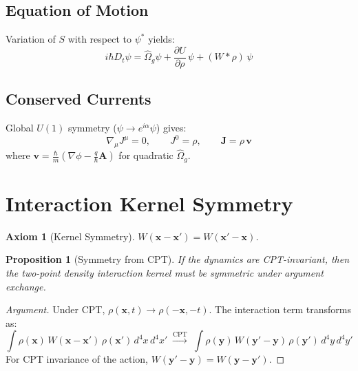 \documentclass[11pt, a4paper]{article}
\newtheorem{axiom}{Axiom}[section]
\newtheorem{proposition}{Proposition}[section]
\begin{document}
\subsection{Equation of Motion}

Variation of $S$ with respect to $\psi^*$ yields:
\begin{equation}
  \boxed{
  i\hbar D_t \psi = \hat{\Omega}_g \psi
    + \frac{\partial U}{\partial \rho}\,\psi
    + (W * \rho)\,\psi
  }
  \label{eq:eom}
\end{equation}

\subsection{Conserved Currents}

Global $U(1)$ symmetry ($\psi \to e^{i\alpha}\psi$) gives:
\begin{equation}
  \nabla_\mu J^\mu = 0, \qquad
  J^0 = \rho, \qquad
  \mathbf{J} = \rho\, \mathbf{v}
  \label{eq:current}
\end{equation}
where $\mathbf{v} = \frac{\hbar}{m}\!\left(\nabla\phi
- \frac{q}{\hbar}\mathbf{A}\right)$ for quadratic $\hat{\Omega}_g$.

\section{Interaction Kernel Symmetry}

\begin{axiom}[Kernel Symmetry]
$W(\mathbf{x}-\mathbf{x}') = W(\mathbf{x}'-\mathbf{x})$.
\end{axiom}

\begin{proposition}[Symmetry from CPT]
If the dynamics are CPT-invariant, then the two-point density
interaction kernel must be symmetric under argument exchange.
\end{proposition}

\begin{proof}[Argument]
Under CPT, $\rho(\mathbf{x},t) \to \rho(-\mathbf{x},-t)$. The
interaction term transforms as:
\[
  \int \rho(\mathbf{x})\, W(\mathbf{x}-\mathbf{x}')\,
  \rho(\mathbf{x}')\, d^4x\, d^4x'
  \;\xrightarrow{\text{CPT}}\;
  \int \rho(\mathbf{y})\, W(\mathbf{y}'-\mathbf{y})\,
  \rho(\mathbf{y}')\, d^4y\, d^4y'
\]
For CPT invariance of the action,
$W(\mathbf{y}'-\mathbf{y}) = W(\mathbf{y}-\mathbf{y}')$.
\end{proof}
\end{document}
